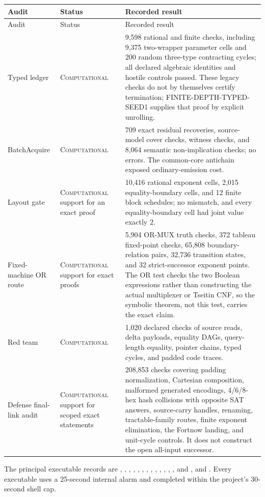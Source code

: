 \documentclass[11pt]{article}
\newcommand{\Comp}{\textsc{Computational}}
\begin{document}
\begin{longtable}{L{0.30\textwidth}L{0.18\textwidth}L{0.44\textwidth}}
\toprule
Audit & Status & Recorded result \\
\midrule
\endfirsthead
\toprule
Audit & Status & Recorded result \\
\midrule
\endhead
\bottomrule
\endfoot
Typed ledger & \Comp{} & 9,598 rational and finite checks, including 9,375
two-wrapper parameter cells and 200 random three-type contracting cycles;
all declared algebraic identities and hostile controls passed.  These legacy
checks do not by themselves certify termination; FINITE-DEPTH-TYPED-SEED1
supplies that proof by explicit unrolling. \\
BatchAcquire & \Comp{} & 709 exact residual recoveries, source-model cover
checks, witness checks, and 8,064 semantic non-implication checks; no errors.
The common-core antichain exposed ordinary-emission cost. \\
Layout gate & \Comp{} support for an exact proof & 10,416 rational exponent
cells, 2,015 equality-boundary cells, and 12 finite block schedules; no
mismatch, and every equality-boundary cell had joint value exactly $2$. \\
Fixed-machine OR route & \Comp{} support for exact proofs & 5,904 OR-MUX
truth checks, 372 tableau fixed-point checks, 65,808 boundary-relation pairs,
32,736 transition states, and 32 strict-successor exponent points.  The OR test
checks the two Boolean expressions rather than constructing the actual
multiplexer or Tseitin CNF, so the symbolic theorem, not this test, carries
the exact claim. \\
Red team & \Comp{} & 1,020 declared checks of source reads, delta payloads,
equality DAGs, query-length equality, pointer chains, typed cycles, and padded
code traces. \\
Defense final-link audit & \Comp{} support for scoped exact statements &
208,853 checks covering padding normalization, Cartesian composition,
malformed generated encodings, 4/6/8-hex hash collisions with opposite SAT
answers, source-carry handles, renaming, tractable-family routes, finite
exponent elimination, the Fortnow landing, and unit-cycle controls.  It does
not construct the open all-input successor. \\
\end{longtable}

The principal executable records are
,
,
,
,
,
,
,
,
,
,
,
,
, and
, and
.
Every executable uses a 25-second internal alarm and completed within the
project's 30-second shell cap.
\end{document}
